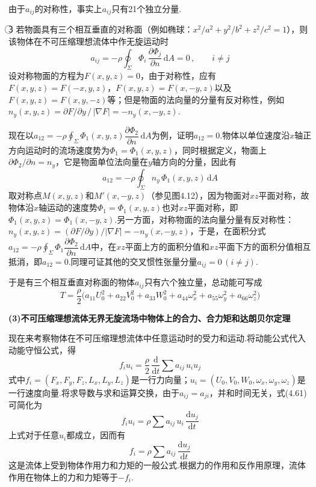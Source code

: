 由于$a_{ij}$的对称性，事实上$a_{ij}$只有21个独立分量.

\textcircled{3} 若物面具有三个相互垂直的对称面（例如椭球：$x^{2}/a^{2}+y^{2}/b^{2}+z^{2}/c^{2}=1$），则该物体在不可压缩理想流体中作无旋运动时
\[
a_{ij}=-\rho\oint_\Sigma\Phi_i\,\frac{\partial\Phi_j}{\partial n}\,\mathrm{d}A=0\,,\qquad i\neq j
\]
设对称物面的方程为$F(x,y,z)=0$，由于对称性，应有$F(x,y,z)=F(-x,y,z)$，$F(x,y,z)=F(x,-y,z)$以及$F(x,y,z)=F(x,y,-z)$等；但是物面的法向量的分量有反对称性，例如$n_y(x,y,z)=\partial F/\partial y\,/\,|\nabla F|=-n_y(x,-y,z)$.

现在以$a_{12}=-\rho\displaystyle\oint_\Sigma\Phi_1(x,y,z)\dfrac{\partial\Phi_2}{\partial n}\,\mathrm{d}A$为例，证明$a_{12}=0$.物体以单位速度沿$x$轴正方向运动时的流场速度势为$\Phi_1=\Phi_1(x,y,z)$，同时根据定义，物面上$\partial\Phi_2/\partial n=n_y$，它是物面单位法向量在$y$轴方向的分量，因此有
\[
a_{12}=-\rho\oint_\Sigma n_y\,\Phi_1(x,y,z)\,\mathrm{d}A
\]
取对称点$M(x,y,z)$和$M'(x,-y,z)$（参见图4.12），因为物面对$xz$平面对称，故物体沿$x$轴运动的速度势$\Phi_1=\Phi_1(x,y,z)$也对$xz$平面对称，即$\Phi_1(x,y,z)=\Phi_1(x,-y,z)$.另一方面，对称物面的法向量分量有反对称性：$n_y(x,y,z)=(\partial F/\partial y)/|\nabla F|=-n_y(x,-y,z)$，于是，在面积分式$a_{12}=-\rho\displaystyle\oint_\Sigma\Phi_1\dfrac{\partial\Phi_2}{\partial n}\,\mathrm{d}A$中，在$xz$平面上方的面积分值和$xz$平面下方的面积分值相互抵消，即$a_{12}=0$.同理可证其他的交叉惯性张量分量$a_{ij}=0\,(i\neq j)$.

于是有三个相互垂直对称面的物体$a_{ij}$只有六个独立量，总动能可写成
\[
T=\frac{\rho}{2}\big(a_{11}U_0^{2}+a_{22}V_0^{2}+a_{33}W_0^{2}+a_{44}\omega_x^{2}+a_{55}\omega_y^{2}+a_{66}\omega_z^{2}\big)
\]

\textbf{(3)不可压缩理想流体无界无旋流场中物体上的合力、合力矩和达朗贝尔定理}

现在来考察物体在不可压缩理想流体中任意运动时的受力和运动.将动能公式代入动能守恒公式，得
\begin{equation*}
f_i u_i=\frac{\rho}{2}\,\frac{\mathrm{d}}{\mathrm{d}t}\sum a_{ij}\,u_i u_j
\tag{4.61}
\end{equation*}
式中$f_i=(F_x,F_y,F_z,L_x,L_y,L_z)$是一行力向量；$u_i=(U_0,V_0,W_0,\omega_x,\omega_y,\omega_z)$是一行速度向量.将求导数与求和运算交换，由于$a_{ij}=a_{ji}$，并和时间无关，式(4.61)可简化为
\begin{equation*}
f_i u_i=\rho\sum a_{ij}\,u_i\,\frac{\mathrm{d}u_j}{\mathrm{d}t}
\tag{4.62}
\end{equation*}
上式对于任意$u_i$都成立，因而有
\begin{equation*}
f_i=\rho\sum a_{ij}\,\frac{\mathrm{d}u_j}{\mathrm{d}t}
\tag{4.63}
\end{equation*}
这是流体上受到物体作用力和力矩的一般公式.根据力的作用和反作用原理，流体作用在物体上的力和力矩等于$-f_i$.

